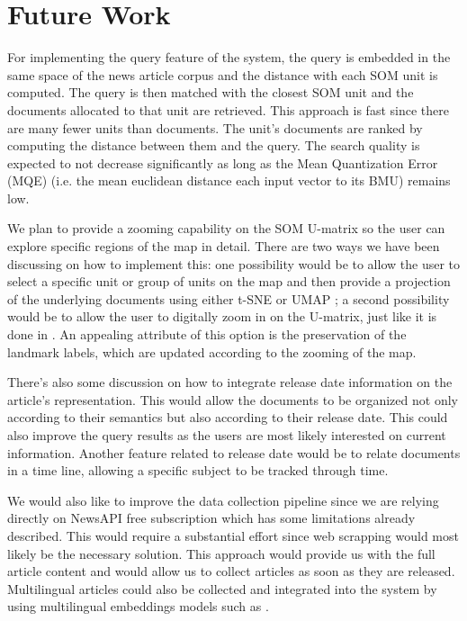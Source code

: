 \documentclass[a4paper]{article}
\begin{document}
\section*{Future Work}
For implementing the query feature of the system, the query is embedded in the same space of the news article corpus and the distance with each SOM unit is computed. The query is then matched with the closest SOM unit and the documents allocated to that unit are retrieved. This approach is fast since there are many fewer units than documents. The unit's documents are ranked by computing the distance between them and the query. The search quality is expected to not decrease significantly as long as the Mean Quantization Error (MQE) (i.e. the mean euclidean distance each input vector to its BMU) remains low.

We plan to provide a zooming capability on the SOM U-matrix so the user can explore specific regions of the map in detail. There are two ways we have been discussing on how to implement this: one possibility would be to allow the user to select a specific unit or group of units on the map and then provide a projection of the underlying documents using either t-SNE \citep{vandermaaten2008} or UMAP \citep{mcinnes2018}; a second possibility would be to allow the user to digitally zoom in on the U-matrix, just like it is done in \citet{kaski1998}. An appealing attribute of this option is the preservation of the landmark labels, which are updated according to the zooming of the map.

There's also some discussion on how to integrate release date information on the article's representation. This would allow the documents to be organized not only according to their semantics but also according to their release date. This could also improve the query results as the users are most likely interested on current information. Another feature related to release date would be to relate documents in a time line, allowing a specific subject to be tracked through time. 

We would also like to improve the data collection pipeline since we are relying directly on NewsAPI free subscription which has some limitations already described. This would require a substantial effort since web scrapping would most likely be the necessary solution. This approach would provide us with the full article content and would allow us to collect articles as soon as they are released. Multilingual articles could also be collected and integrated into the system by using multilingual embeddings models such as \citet{conneau2019}.
\end{document}
